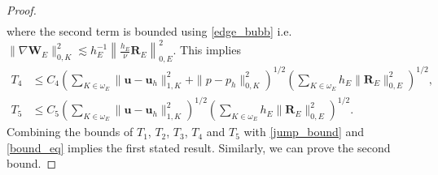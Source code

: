 \documentclass[10pt,a4paper]{article}
\begin{document}
\begin{proof}
\begin{align*}
   \end{align*}
   where the second term is bounded using \eqref{edge_bubb} i.e.
$\|\nabla \boldsymbol{W}_E\|^2_{0,K} \lesssim h_E^{-1} \left\| \frac{h_E}{\nu} \boldsymbol{R}_E\right\|^2_{0,E} $. This implies 
\begin{align*}
T_4 & \leq C_4 \left( \sum_{K \in \omega_E} \| \boldsymbol{u} - \boldsymbol{u}_h \|^2_{1,K} + \|p-p_h\|_{0,K}^2   \right)^{1/2}  \left(  \sum_{K \in \omega_E} h_E \| \boldsymbol{R}_E\|^2_{0,E} \right)^{1/2}, \\
T_5 &\leq C_5 \left( \sum_{K \in \omega_E} \|\boldsymbol{u} - \boldsymbol{u}_h \|_{1,K}^2 \right)^{1/2} \left(  \sum_{K \in \omega_E} h_E \| \boldsymbol{R}_E\|^2_{0,E} \right)^{1/2}.
   \end{align*}
   Combining the bounds of $T_1$, $T_2$, $T_3$, $T_4$ and $T_5$ with \eqref{jump_bound} and \eqref{bound_eq} implies the first stated result. Similarly, we can prove the second bound.  
\end{proof}
\end{document}
